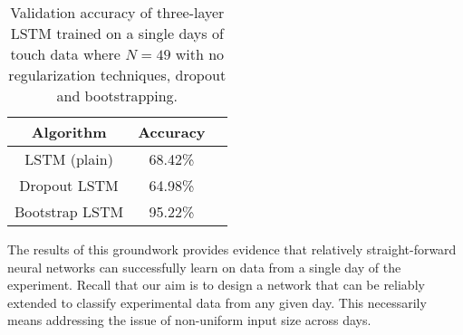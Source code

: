 \documentclass[12pt]{article}
\begin{document}
\begin{table}[]
  \centering
\begin{tabular}{|c|c|c|}
  \hline
                Algorithm    & Accuracy   \\
                      \hline
LSTM (plain) & 68.42\%   \\
  \hline
Dropout LSTM                 & 64.98\%     \\
  \hline
Bootstrap LSTM                 & 95.22\%     \\
\hline
\end{tabular}
\caption{Validation accuracy of three-layer LSTM trained on a single days of touch data where $N = 49$ with no regularization techniques, dropout and bootstrapping.}
\label{tab:LSTM}
\end{table}
The results of this groundwork provides evidence that relatively straight-forward neural networks can successfully learn on data from a single day of the experiment.  Recall that our aim is to design a network that can be reliably extended to classify experimental data from any given day. This necessarily means addressing the issue of non-uniform input size across days.
\end{document}
